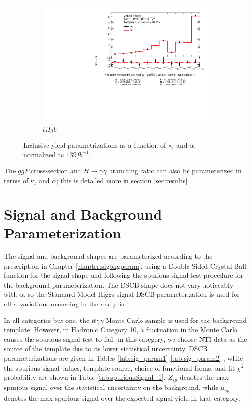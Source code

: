 \begin{figure}[htp]
\begin{subfigure}[b]{0.3\textwidth}
         \includegraphics[width=\textwidth]{figures/tthcp_results/yield_tHjb_0.pdf}
         \caption{$tHjb$}
         \label{fig:tHjbYield}
     \end{subfigure}
     \hfill
  \label{fig:YieldParams}
  \caption{Inclusive yield parametrizations as a function of $\kappa_{t}$ and $\alpha$, normalized to $139 fb^{-1}$.}  
\end{figure}


The $ggF$ cross-section and $H \rightarrow \gamma \gamma$ branching ratio can also be parameterized in terms of $\kappa_{t}$ and $\alpha$; this is detailed more in section \ref{sec:results}

\section{Signal and Background Parameterization}

The signal and background shapes are parameterized according to the prescription in Chapter \ref{chapter:sigbkgparam}, using a Double-Sided Crystal Ball function for the signal shape and following the spurious signal test procedure for the background parameterization. The DSCB shape does not vary noticeably with $\alpha$, so the Standard-Model Higgs signal DSCB parameterization is used for all $\alpha$ variations occurring in the analysis.

In all categories but one, the $tt\gamma\gamma$ Monte Carlo sample is used for the background template. However, in Hadronic Category 10, a fluctuation in the Monte Carlo causes the spurious signal test to fail- in this category, we choose NTI data as the source of the template due to its lower statistical uncertainty. DSCB parameterizations are given in Tables \ref{tab:sig_param1}-\ref{tab:sig_param2} , while the spurious signal values, template source, choice of functional forms, and fit $\chi^{2}$ probability are shown in Table \ref{tab:spuriousSignal_1}. $Z_{sp}$ denotes the max spurious signal over the statistical uncertainty on the background, while $\mu_{sp}$ denotes the max spurious signal over the expected signal yield in that category.

